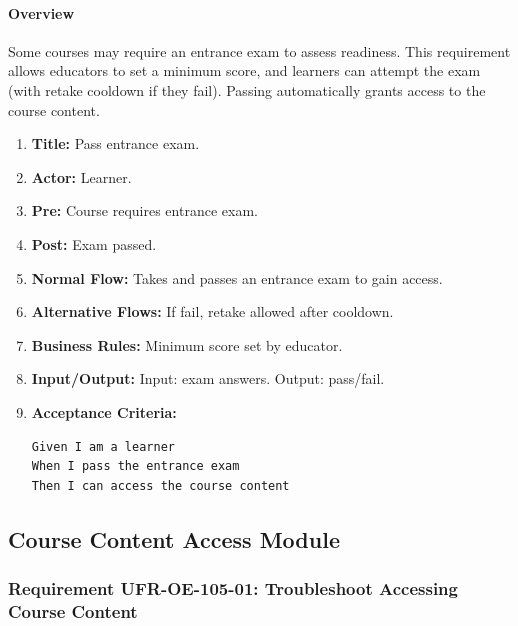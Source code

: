 \paragraph{Overview}
Some courses may require an entrance exam to assess readiness. This requirement allows educators to set a minimum score, and learners can attempt the exam (with retake cooldown if they fail). Passing automatically grants access to the course content.
\begin{enumerate}[label=\textbf{\arabic*.}]
\item \textbf{Title:} Pass entrance exam.
\item \textbf{Actor:} Learner.
\item \textbf{Pre:} Course requires entrance exam.
\item \textbf{Post:} Exam passed.
\item \textbf{Normal Flow:} Takes and passes an entrance exam to gain access.
\item \textbf{Alternative Flows:} If fail, retake allowed after cooldown.
\item \textbf{Business Rules:} Minimum score set by educator.
\item \textbf{Input/Output:} Input: exam answers. Output: pass/fail.
\item \textbf{Acceptance Criteria:}
    \begin{verbatim}
Given I am a learner
When I pass the entrance exam
Then I can access the course content
    \end{verbatim}
\end{enumerate}

\subsection{Course Content Access Module}
\subsubsection{Requirement UFR-OE-105-01: Troubleshoot Accessing Course Content}
